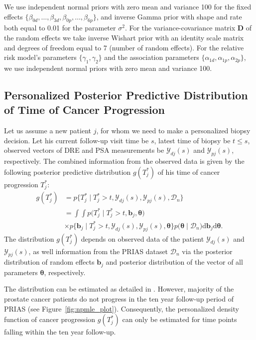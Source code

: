 We use independent normal priors with zero mean and variance 100 for the fixed effects ${\{\beta_{0d},\ldots,\beta_{3d}, \beta_{0p},\ldots,\beta_{6p}\}}$, and inverse Gamma prior with shape and rate both equal to 0.01 for the parameter $\sigma^2$. For the variance-covariance matrix $\boldsymbol{D}$ of the random effects we take inverse Wishart prior with an identity scale matrix and degrees of freedom equal to 7 (number of random effects). For the relative risk model's parameters $\{\gamma_1, \gamma_2\}$ and the association parameters $\{\alpha_{1d}, \alpha_{1p}, \alpha_{2p}\}$, we use independent normal priors with zero mean and variance 100.

\subsection{Personalized Posterior Predictive Distribution of Time of Cancer Progression}
Let us assume a new patient $j$, for whom we need to make a personalized biopsy decision. Let his current follow-up visit time be $s$, latest time of biopsy be $t\leq s$, observed vectors of DRE and PSA measurements be $\mathcal{Y}_{dj}(s)$ and $\mathcal{Y}_{pj}(s)$, respectively. The combined information from the observed data is given by the following posterior predictive distribution $g(T^*_j)$ of his time of cancer progression $T^*_j$:
\begin{equation*}
\label{eq:post_pred_dist}
\begin{aligned}
g(T^*_j) &= p\big\{T^*_j \mid T^*_j > t, \mathcal{Y}_{dj}(s), \mathcal{Y}_{pj}(s), \mathcal{D}_n\big\}\\
&= \int \int p\big(T^*_j \mid T^*_j > t, \boldsymbol{b}_j, \boldsymbol{\theta}\big)\\
&\times p\big\{\boldsymbol{b}_j \mid T^*_j>t, \mathcal{Y}_{dj}(s), \mathcal{Y}_{pj}(s), \boldsymbol{\theta}\big\}p\big(\boldsymbol{\theta} \mid \mathcal{D}_n\big) \mathrm{d} \boldsymbol{b}_j \mathrm{d} \boldsymbol{\theta}.
\end{aligned}
\end{equation*}
The distribution $g(T^*_j)$ depends on observed data of the patient $\mathcal{Y}_{dj}(s)$ and $\mathcal{Y}_{pj}(s)$, as well information from the PRIAS dataset $\mathcal{D}_n$ via the posterior distribution of random effects $\boldsymbol{b}_j$ and posterior distribution of the vector of all parameters $\boldsymbol{\theta}$, respectively.

The distribution can be estimated as detailed in \citet{landmarking2017}. However, majority of the prostate cancer patients do not progress in the ten year follow-up period of PRIAS (see Figure~\ref{fig:npmle_plot}). Consequently, the personalized density function of cancer progression $g(T^*_j)$ can only be estimated for time points falling within the ten year follow-up. 